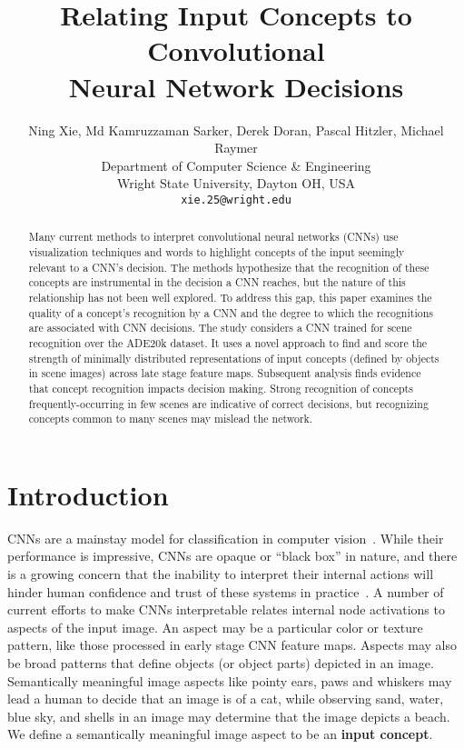 \documentclass{article}
\title{Relating Input Concepts to Convolutional \\Neural Network Decisions}
\author{
  Ning Xie, Md Kamruzzaman Sarker, Derek Doran, Pascal Hitzler, Michael Raymer\\
  Department of Computer Science \& Engineering\\
  Wright State University, Dayton OH, USA\\
  \texttt{xie.25@wright.edu} \\
}
\begin{document}
\maketitle

\begin{abstract}
Many current methods to interpret convolutional neural
 networks (CNNs) use
visualization techniques and words to highlight
concepts of the input seemingly relevant to a CNN's decision. 
The methods hypothesize that the recognition of these concepts are instrumental in the 
decision a CNN reaches, but the nature of this relationship has not been well
explored. To address this gap, this paper examines the quality of a concept's recognition 
by a CNN and the degree to which the recognitions 
are associated with CNN decisions. The study considers a CNN trained for scene recognition over
the ADE20k dataset. It uses a novel approach to find and score the 
strength of minimally distributed representations of input concepts (defined by objects in scene images) across 
late stage feature maps. Subsequent analysis finds evidence that 
concept recognition impacts decision making. 
Strong recognition of concepts frequently-occurring in few scenes are indicative of 
correct decisions, but recognizing concepts common to many scenes may mislead the network. 
\end{abstract}
 
\section{Introduction}
\label{sec:intro_section}

CNNs are a mainstay model for classification  
in computer vision~\citep{lecun1998gradient,girshick2014rich,ren2015faster,simonyan2014very,sun2014deep}.
While their performance is impressive, CNNs are 
opaque or ``black box'' in nature, and there is a growing concern that the inability to interpret 
their internal actions will hinder human confidence and
trust of these systems in practice~\citep{lipton16, doran17}. 
A number of current efforts to make CNNs interpretable relates internal node activations to 
aspects of the input image. An aspect may be a particular color or texture pattern,
like those processed in early stage CNN feature maps. Aspects
may also be broad patterns that define objects (or object parts) 
depicted in an image. Semantically meaningful image aspects like
pointy ears, paws and whiskers may 
lead a human to decide that an image is of a cat, while observing 
sand, water, blue sky, and shells in an image may
determine that the image depicts a beach. We define a semantically meaningful image aspect to 
be an {\bf input concept}. 
\end{document}
